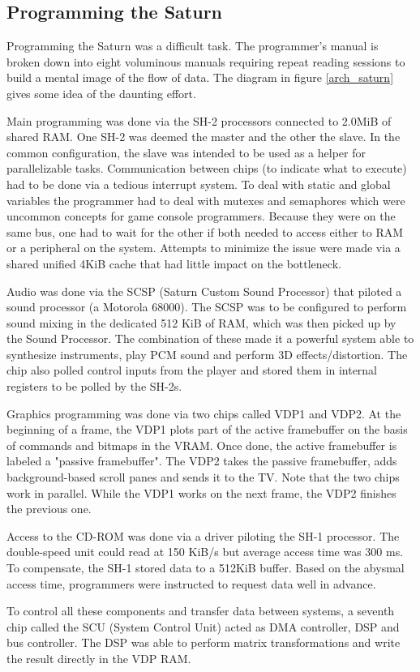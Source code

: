 \subsection{Programming the Saturn}
Programming the Saturn was a difficult task. The programmer's manual is broken down into eight voluminous manuals requiring repeat reading sessions to build a mental image of the flow of data. The diagram in figure \ref{arch_saturn} gives some idea of the daunting effort.\\
\par
Main programming was done via the SH-2 processors connected to 2.0MiB of shared RAM. One SH-2 was deemed the master and the other the slave. In the common configuration, the slave was intended to be used as a helper for parallelizable tasks. Communication between chips (to indicate what to execute) had to be done via a tedious interrupt system. To deal with static and global variables the programmer had to deal with mutexes and semaphores which were uncommon concepts for game console programmers. Because they were on the same bus, one had to wait for the other if both needed to access either to RAM or a peripheral on the system. Attempts to minimize the issue were made via a shared unified 4KiB cache that had little impact on the bottleneck.\\
\par
Audio was done via the SCSP (Saturn Custom Sound Processor) that piloted a sound processor (a Motorola 68000). The SCSP was to be configured to perform sound mixing in the dedicated 512 KiB of RAM, which was then picked up by the Sound Processor. The combination of these made it a powerful system able to synthesize instruments, play PCM sound and perform 3D effects/distortion. The chip also polled control inputs from the player and stored them in internal registers to be polled by the SH-2s.\\
\par
Graphics programming was done via two chips called VDP1 and VDP2. At the beginning of a frame, the VDP1 plots part of the active framebuffer on the basis of commands and bitmaps in the VRAM. Once done, the active framebuffer is labeled a "passive framebuffer". The VDP2 takes the passive framebuffer, adds background-based scroll panes and sends it to the TV. Note that the two chips work in parallel. While the VDP1 works on the next frame, the VDP2 finishes the previous one.\\
\par
Access to the CD-ROM was done via a driver piloting the SH-1 processor. The double-speed unit could read at 150 KiB/s but average access time was 300 ms. To compensate, the SH-1 stored data to a 512KiB buffer. Based on the abysmal access time, programmers were instructed to request data well in advance.\\ 
\par
To control all these components and transfer data between systems, a seventh chip called the SCU (System Control Unit) acted as DMA controller, DSP and bus controller. The DSP was able to perform matrix transformations and write the result directly in the VDP RAM.\\
\par


